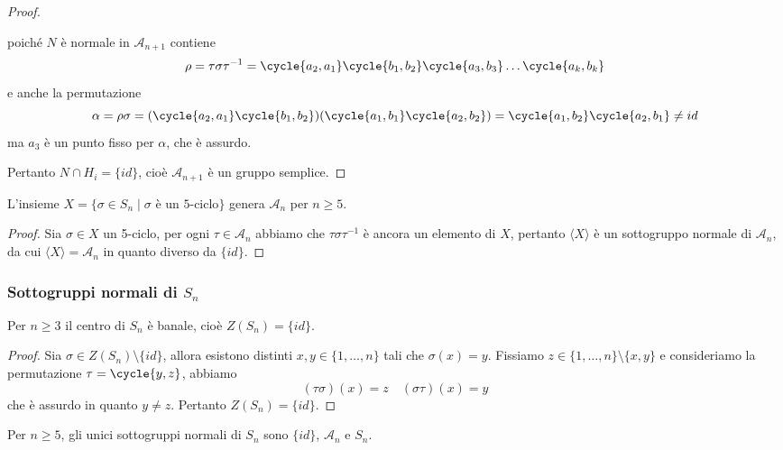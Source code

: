 \documentclass[11pt]{scrartcl}
\begin{document}
\begin{proof}
\begin{itemize}
        poiché $N$ è normale in $\mathcal{A}_{n + 1}$ contiene
        \[
            \rho = \tau\sigma\tau^{-1} = \cycle{a_2, a_1}\cycle{b_1, b_2}
            \cycle{a_3, b_3}\ldots\cycle{a_k, b_k}
        \]
        e anche la permutazione 
        \[
            \alpha = \rho\sigma = (\cycle{a_2, a_1}\cycle{b_1, b_2})
            (\cycle{a_1, b_1}\cycle{a_2, b_2}) = \cycle{a_1, b_2}\cycle{a_2, b_1} \neq id
        \]
        ma $a_3$ è un punto fisso per $\alpha$, che è assurdo.
    \end{itemize}
    Pertanto $N\cap H_i = \{id\}$, cioè $\mathcal{A}_{n + 1}$ è un gruppo semplice.
\end{proof}

\begin{corollary}
    L'insieme $X = \{\sigma \in S_n\mid \sigma \text{ è un 5-ciclo}\}$ genera
    $\mathcal{A}_n$ per $n \geqslant 5$.
\end{corollary}

\begin{proof}
    Sia $\sigma \in X$ un 5-ciclo, per ogni $\tau \in \mathcal{A}_n$
    abbiamo che $\tau\sigma\tau^{-1}$ è ancora un elemento di $X$, pertanto
    $\langle X\rangle$ è un sottogruppo normale di $\mathcal{A}_n$, da cui 
    $\langle X \rangle = \mathcal{A}_n$ in quanto diverso da $\{id\}$.
\end{proof}


\subsubsection{Sottogruppi normali di $S_n$}

\begin{lemma}
    \label{lemma1.65}
    Per $n \geq 3$ il centro di $S_n$ è banale, cioè $Z(S_n) = \{id\}$.
\end{lemma}

\begin{proof}
    Sia $\sigma \in Z(S_n) \setminus \{id\}$, allora esistono distinti 
    $x, y \in \{1, \ldots, n\}$ tali che $\sigma(x) = y$. Fissiamo 
    $z \in \{1, \ldots, n\}\setminus \{x, y\}$ e consideriamo la permutazione
    $\tau = \cycle{y, z}$, abbiamo
    \[
        (\tau\sigma)(x) = z \quad (\sigma\tau)(x) = y
    \]
    che è assurdo in quanto $y \neq z$. Pertanto $Z(S_n) = \{id\}$.
\end{proof}

\begin{proposition}
    Per $n\geq 5$, gli unici sottogruppi normali di $S_n$ sono $\{id\}$,
    $\mathcal{A}_n$ e $S_n$.
\end{proposition}
\end{document}
